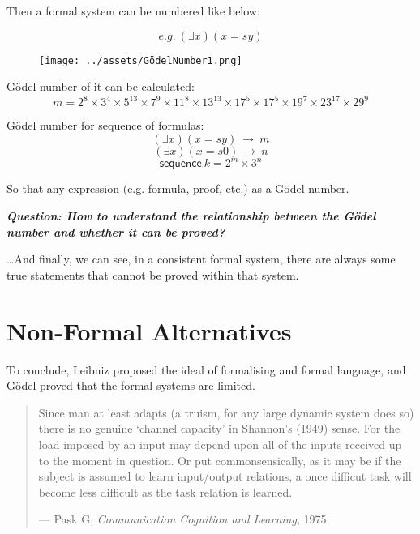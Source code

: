 \documentclass[a4paper, openany]{book}
\begin{document}
\hspace*{\fill}

\hspace*{\fill}

Then a formal system can be numbered like below:

$$e.g. \  ( \exists x ) ( x = sy )$$

\begin{figure}[htbp]
  \centering
  \texttt{[image: ../assets/GödelNumber1.png]}
\end{figure}

Gödel number of it can be calculated:
$$m = 2^8 \times 3^4 \times 5^{13} \times 7^9 \times 11^8 \times 13^{13} \times 17^5 \times 17^5 \times 19^7 \times 23^{17} \times 29^9$$

Gödel number for sequence of formulas:
$$( \exists x ) ( x = sy ) \  \rightarrow \  m$$
$$( \exists x ) ( x = s0 ) \  \rightarrow \  n$$
$$\mathsf{sequence} \  k = 2^m \times 3^n$$

So that any expression (e.g. formula, proof, etc.) as a Gödel number.

\textbf{\textit{Question: How to understand the relationship between the Gödel number and whether it can be proved?}}

\dots And finally, we can see, in a consistent formal system, there are always some true statements that cannot be proved within that system.

\section{Non-Formal Alternatives}

To conclude, Leibniz proposed the ideal of formalising and formal language, and Gödel proved that the formal systems are limited.

\begin{quote}
  Since man at least adapts (a truism, for any large dynamic system does so) there is no genuine ‘channel capacity’ in Shannon’s (1949) sense. For the load imposed by an input may depend upon all of the inputs received up to the moment in question. Or put commonsensically, as it may be if the subject is assumed to learn input/output relations, a once difficut task will become less difficult as the task relation is learned.

  \begin{flushright}
    --- Pask G, \textit{Communication Cognition and Learning}, 1975
  \end{flushright}
\end{quote}
\end{document}
